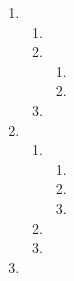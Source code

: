 \begin{enumerate}[itemsep=5pt, label=\textbf{\arabic*}. ]
\begin{enumerate}[noitemsep, label=\textbf{(\alph*)} ]
    \item %
    \item %
    \end{enumerate}
  \item %
    \begin{enumerate}[noitemsep, label=\textbf{(\alph*)} ]
    \item %
    \item %
      \begin{enumerate}
      \item %
      \item %
      \end{enumerate} 
    \item %
    \end{enumerate}
  \item %
    \begin{enumerate}[noitemsep, label=\textbf{(\alph*)} ]
\item %
      \begin{enumerate}
      \item %
      \item %
      \item %
      \end{enumerate}
    \item %
    \item %
    \end{enumerate}
\item %
    \begin{enumerate}[noitemsep, label=\textbf{(\alph*)} ]

\end{enumerate}
\end{enumerate}
